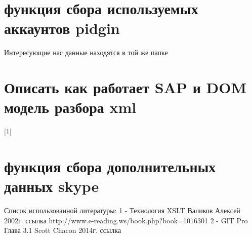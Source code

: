 \chapter*{функция сбора используемых аккаунтов pidgin}
Интересующие нас данные находятся в той же папке %
\chapter*{Описать как работает SAP и DOM модель разбора xml}
[1]%
\chapter*{функция сбора дополнительных данных skype}
Список использованной литературы:
1 -  Технология XSLT Валиков Алексей 2002г. ссылка http://www.e-reading.ws/book.php?book=1016301
2 -  GIT Pro Глава 3.1 Scott Chacon 2014г. ссылка 